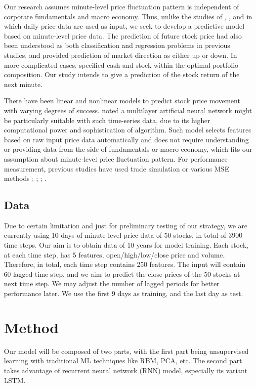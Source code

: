 \documentclass{article}
\begin{document}
Our research assumes minute-level price fluctuation pattern is independent of corporate fundamentals and macro economy. Thus, unlike the studies of \cite{Chiang2016}, \cite{Chourmouziadis2016}, and \cite{Zhong2017} in which daily price data are used as input, we seek to develop a predictive model based on minute-level price data. The prediction of future stock price had also been understood as both classification and regression problems in previous studies. \cite{Chen2016} and \cite{Zhong2017} provided prediction of market direction as either up or down. In more complicated cases, \cite{Chourmouziadis2016} specified cash and stock within the optimal portfolio composition. Our study intends to give a prediction of the stock return of the next minute.

There have been linear and nonlinear models to predict stock price movement with varying degrees of success. \cite{Chong2017} noted a multilayer artificial neural network might be particularly suitable with such time-series data, due to its higher computational power and sophistication of algorithm. Such model selects features based on raw input price data automatically and does not require understanding or providing data from the side of fundamentals or macro economy, which fits our assumption about minute-level price fluctuation pattern. For performance measurement, previous studies have used trade simulation or various MSE methods \cite{Chiang2016}; \cite{Chourmouziadis2016}; \cite{Zhong2017}; \cite{Chong2017}.

\subsection{Data}

Due to certain limitation and just for preliminary testing of our strategy, we are currently using 10 days of minute-level price data of 50 stocks, in total of 3900 time steps. Our aim is to obtain data of 10 years for model training. Each stock, at each time step, has 5 features, open/high/low/close price and volume. Therefore, in total, each time step contains 250 features. The input will contain 60 lagged time step, and we aim to predict the close prices of the 50 stocks at next time step. We may adjust the number of lagged periods for better performance later. We use the first 9 days as training, and the last day as test.

\section{Method}
Our model will be composed of two parts, with the first part being unsupervised learning with traditional ML techniques like RBM, PCA, etc. The second part takes advantage of recurrent neural network (RNN) model, especially its variant LSTM. 
\end{document}

